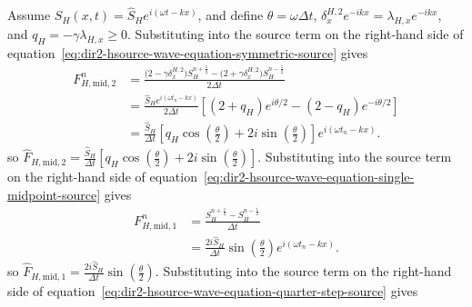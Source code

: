 \documentclass{article}
\numberwithin{figure}{section}
\begin{document}
Assume $S_H(x,t)=\widehat{S}_H e^{i(\omega t-kx)}$, and define $\theta=\omega\Delta t$, $\delta_x^{H,2}e^{-ikx}=\lambda_{H,x}e^{-ikx}$, and $q_H=-\gamma\lambda_{H,x}\geq0$. Substituting into the source term on the right-hand side of equation~\eqref{eq:dir2-hsource-wave-equation-symmetric-source} gives
\begin{equation}
    \begin{aligned} F_{H,\mathrm{mid,2}}^n & =\frac{\bigl(2-\gamma\delta_x^{H,2}\bigr)S_H^{n+\frac{1}{2}}-\bigl(2+\gamma\delta_x^{H,2}\bigr)S_H^{n-\frac{1}{2}}}{2\Delta t} \\
                                       & =\frac{\widehat{S}_H e^{i(\omega t_n-kx)}}{2\Delta t}\left[\left(2+q_H\right)e^{i\theta/2}-\left(2-q_H\right)e^{-i\theta/2}\right]            \\
                                       & =\frac{\widehat{S}_H}{\Delta t}\left[q_H\cos\left(\frac{\theta}{2}\right)+2i\sin\left(\frac{\theta}{2}\right)\right]e^{i(\omega t_n-kx)}.
    \end{aligned} \label{eq:dir2-hsource-midpoint-both-source-amplitude}
\end{equation}
so $\widehat{F}_{H,\mathrm{mid,2}}=\frac{\widehat{S}_H}{\Delta t}\left[q_H\cos\left(\frac{\theta}{2}\right)+2i\sin\left(\frac{\theta}{2}\right)\right]$.
Substituting into the source term on the right-hand side of equation~\eqref{eq:dir2-hsource-wave-equation-single-midpoint-source} gives
\begin{equation}
    \begin{aligned} F_{H,\mathrm{mid,1}}^n & =\frac{S_H^{n+\frac{1}{2}}-S_H^{n-\frac{1}{2}}}{\Delta t}                                      \\
                                       & =\frac{2i\widehat{S}_H}{\Delta t}\sin\left(\frac{\theta}{2}\right)e^{i(\omega t_n-kx)}.
    \end{aligned} \label{eq:dir2-hsource-midpoint-source-amplitude}
\end{equation}
so $\widehat{F}_{H,\mathrm{mid,1}}=\frac{2i\widehat{S}_H}{\Delta t}\sin\left(\frac{\theta}{2}\right)$.
Substituting into the source term on the right-hand side of equation~\eqref{eq:dir2-hsource-wave-equation-quarter-step-source} gives
\end{document}

